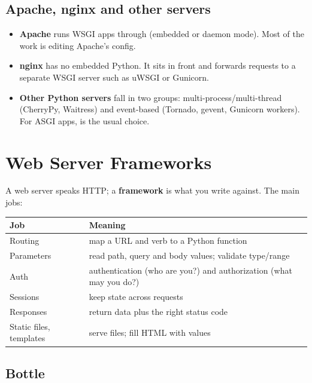 \subsection{Apache, nginx and other servers}

\begin{itemize}[leftmargin=*]
\item \textbf{Apache} runs WSGI apps through  (embedded or daemon mode). Most of the
work is editing Apache's config.
\item \textbf{nginx} has no embedded Python. It sits in front and forwards requests to a separate
WSGI server such as uWSGI or Gunicorn.
\item \textbf{Other Python servers} fall in two groups: multi-process/multi-thread (CherryPy,
Waitress) and event-based (Tornado, gevent, Gunicorn workers). For ASGI apps,  is
the usual choice.
\end{itemize}

\section{Web Server Frameworks}

A web server speaks HTTP; a \textbf{framework} is what you write against. The main jobs:

\begin{center}
\begin{tabularx}{\linewidth}{@{}l X@{}}
\toprule
\textbf{Job} & \textbf{Meaning} \\
\midrule
Routing & map a URL and verb to a Python function \\
Parameters & read path, query and body values; validate type/range \\
Auth & authentication (who are you?) and authorization (what may you do?) \\
Sessions & keep state across requests \\
Responses & return data plus the right status code \\
Static files, templates & serve files; fill HTML with values \\
\bottomrule
\end{tabularx}
\end{center}

\subsection{Bottle}

